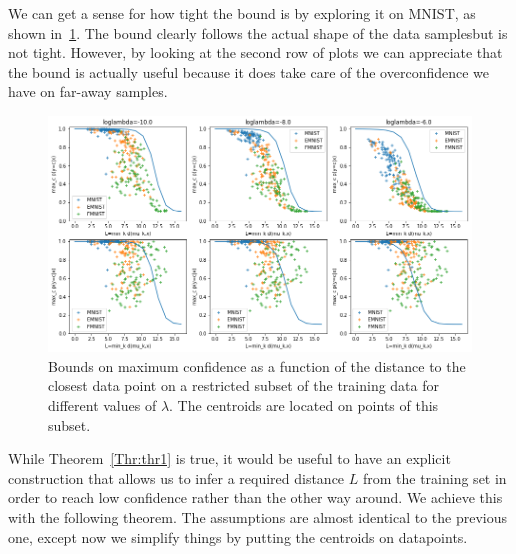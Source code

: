 \documentclass[12pt]{article}
\begin{document}
We can get a sense for how tight the bound is by exploring it on MNIST, as shown in~\ref{Fig:EpsilonL}. The bound clearly follows the actual shape of the data samplesbut is not tight. However, by looking at the second row of plots we can appreciate that the bound is actually useful because it does take care of the overconfidence we have on far-away samples. 

\begin{figure}
\includegraphics[width=\textwidth]{res/epsilon_L}
\caption{\label{Fig:EpsilonL} Bounds on maximum confidence as a function of the distance to the closest data point on a restricted subset of the training data for different values of $\lambda$. The centroids are located on points of this subset.}
\end{figure}

While Theorem~\ref{Thr:thr1} is true, it would be useful to have an explicit construction that allows us to infer a required distance $L$ from the training set in order to reach low confidence rather than the other way around. We achieve this with the following theorem. The assumptions are almost identical to the previous one, except now we simplify things by putting the centroids on datapoints.
\end{document}
